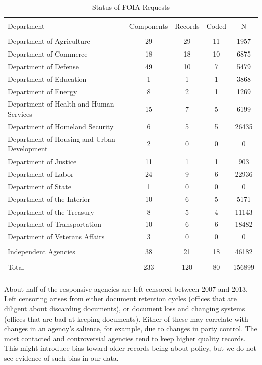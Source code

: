 \documentclass{article}
\begin{document}
\begin{table}[!htbp] \centering 
  \caption{Status of FOIA Requests} 
  \label{t:FOIA} 
\begin{tabular}{@{\extracolsep{5pt}} lcccc} 
\\[-1.8ex]\hline 
\hline \\[-1.8ex] 
Department & Components & Records & Coded & N \\ 
\hline \\[-1.8ex] 
Department of Agriculture & 29 & 29 & 11 & 1957 \\ 
Department of Commerce & 18 & 18 & 10 & 6875 \\ 
Department of Defense & 49 & 10 & 7 & 5479 \\ 
Department of Education & 1 & 1 & 1 & 3868 \\ 
Department of Energy & 8 & 2 & 1 & 1269 \\ 
Department of Health and Human Services & 15 & 7 & 5 & 6199 \\ 
Department of Homeland Security & 6 & 5 & 5 & 26435 \\ 
Department of Housing and Urban Development & 2 & 0 & 0 & 0 \\ 
Department of Justice & 11 & 1 & 1 & 903 \\ 
Department of Labor & 24 & 9 & 6 & 22936 \\ 
Department of State & 1 & 0 & 0 & 0 \\ 
Department of the Interior & 10 & 6 & 5 & 5171 \\ 
Department of the Treasury & 8 & 5 & 4 & 11143 \\ 
Department of Transportation & 10 & 6 & 6 & 18482 \\ 
Department of Veterans Affairs & 3 & 0 & 0 & 0 \\ 
\hline \\[-1.8ex] 
Independent Agencies & 38 & 21 & 18 & 46182 \\ 
\hline \\[-1.8ex] 
Total & 233 & 120 & 80 & 156899 \\ 
\hline \\[-1.8ex] 
\end{tabular} 
\end{table} 

About half of the responsive agencies are left-censored between 2007 and 2013. Left censoring arises from either document retention cycles (offices that are diligent about discarding documents), or document loss and changing systems (offices that are bad at keeping documents). Either of these may correlate with changes in an agency's salience, for example, due to changes in party control. 
The most contacted and controversial agencies tend to keep higher quality records. 
This might introduce bias toward older records being about policy, but we do not see evidence of such bias in our data. 
\end{document}
